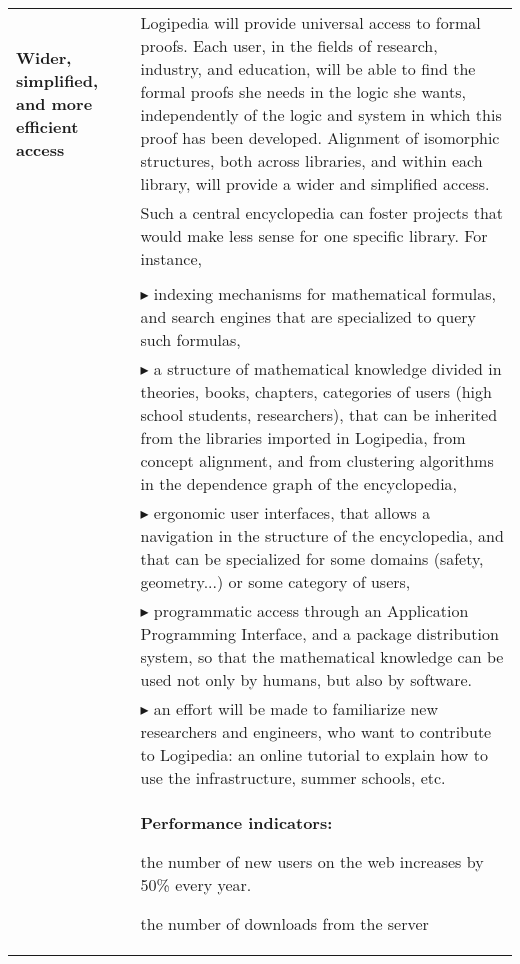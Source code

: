 \begin{longtable}{|p{}|p{}|}
\hline
{\bf Wider, simplified, and more efficient access}&

Logipedia will provide universal access to formal proofs.
Each
user, in the fields of research, industry, and education, will be able to
find the formal proofs
she needs in the logic she wants, independently of the logic and system in
which this
proof has been developed.  Alignment of isomorphic structures, both
across libraries, and
within each library, will provide a wider and simplified access.\\
&
\hspace{0.4cm}
Such a central encyclopedia can foster
projects that would make less sense for one specific library. For instance,\\
\\
&
$\blacktriangleright$
indexing mechanisms for mathematical formulas, and search engines
  that are specialized to query such formulas,
\\
&
$\blacktriangleright$
a structure of mathematical knowledge divided in theories, books,
    chapters, categories of users (high school students, researchers),
    that can be inherited from the libraries imported in
      Logipedia, from concept alignment, and from clustering
    algorithms in the dependence graph of the encyclopedia,
\\
&
$\blacktriangleright$
  ergonomic user interfaces, that allows a navigation in the
    structure of the encyclopedia, and that can be specialized for
    some domains (safety, geometry...) or some category of users,
\\
&
$\blacktriangleright$ programmatic access through an Application Programming
    Interface, and a package distribution system, so that the
    mathematical knowledge can be used not only by humans, but also by
    software.
\\
&
$\blacktriangleright$
an effort will be made to familiarize new researchers and engineers,
who want to contribute to Logipedia:
an online tutorial to explain how to use the infrastructure,
summer schools, etc.
\\
&
\colorbox{color2}{\bf Performance indicators:}
\begin{compactitem}
\item the number of new users on the web increases
  by 50\% every year.
\item the number of downloads from the server

\end{compactitem}
\end{longtable}
